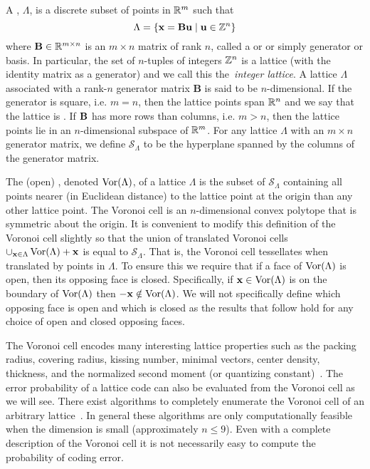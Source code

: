 \documentclass[journal, onecolumn, 11pt]{IEEEtran}
\begin{document}
A , $\Lambda$, is a discrete subset of points in ${\mathbb R}^m$ such that
\[
   \Lambda = \{\mathbf{x} = \mathbf{B}\mathbf{u} \mid \mathbf{u} \in {\mathbb Z}^n \}
 \]
 where $\mathbf{B} \in {\mathbb R}^{m \times n}$ is an $m \times n$ matrix of rank $n$, called a  or  or simply generator or basis. In particular, the set of $n$-tuples of integers ${\mathbb Z}^n$ is a lattice (with the identity matrix as a generator) and we call this the~\emph{integer lattice}. A lattice $\Lambda$ associated with a rank-$n$ generator matrix $\mathbf{B}$ is said to be $n$-dimensional. If the generator is square, i.e. $m = n$, then the lattice points span ${\mathbb R}^n$ and we say that the lattice is . If $\mathbf{B}$ has more rows than columns, i.e. $m > n$, then the lattice points lie in an $n$-dimensional subspace of ${\mathbb R}^m$. For any lattice $\Lambda$ with an $m \times n$ generator matrix, we define $\mathcal{S}_{\Lambda}$ to be the hyperplane spanned by the columns of the generator matrix. %

The (open) , denoted $\operatorname{Vor}(\Lambda)$, of a lattice $\Lambda$ is the subset of $\mathcal{S}_{\Lambda}$ containing all points nearer (in Euclidean distance) to the lattice point at the origin than any other lattice point. The Voronoi cell is an $n$-dimensional convex polytope that is symmetric about the origin.  It is convenient to modify this definition of the Voronoi cell slightly so that the union of translated Voronoi cells $\cup_{\mathbf{x} \in \Lambda}\operatorname{Vor}(\Lambda) + \mathbf{x}$ is equal to  $\mathcal{S}_{\Lambda}$.  That is, the Voronoi cell tessellates when translated by points in $\Lambda$.  To ensure this we require that if a face of $\operatorname{Vor}(\Lambda)$ is open, then its opposing face is closed. Specifically, if $\mathbf{x} \in \operatorname{Vor}(\Lambda)$ is on the boundary of $\operatorname{Vor}(\Lambda)$ then $-\mathbf{x} \notin \operatorname{Vor}(\Lambda)$.  We will not specifically define which opposing face is open and which is closed as the results that follow hold for any choice of open and closed opposing faces.

The Voronoi cell encodes many interesting lattice properties such as the packing radius, covering radius, kissing number, minimal vectors, center density, thickness, and the normalized second moment (or quantizing constant)~\cite{Viterbo_diamond_cutting_1996, SPLAG}. The error probability of a lattice code can also be evaluated from the Voronoi cell as we will see.  There exist algorithms to completely enumerate the Voronoi cell of an arbitrary lattice~\cite{Viterbo_diamond_cutting_1996,Sikiric_complex_algs_vor_cells_2009,Sikiric_vor_reduction_covering_2008,Valentin2003_coverings_tilings_low_dimension}.  In general these algorithms are only computationally feasible when the dimension is small (approximately $n \leq 9$).  Even with a complete description of the Voronoi cell it is not necessarily easy to compute the probability of coding error.
\end{document}
